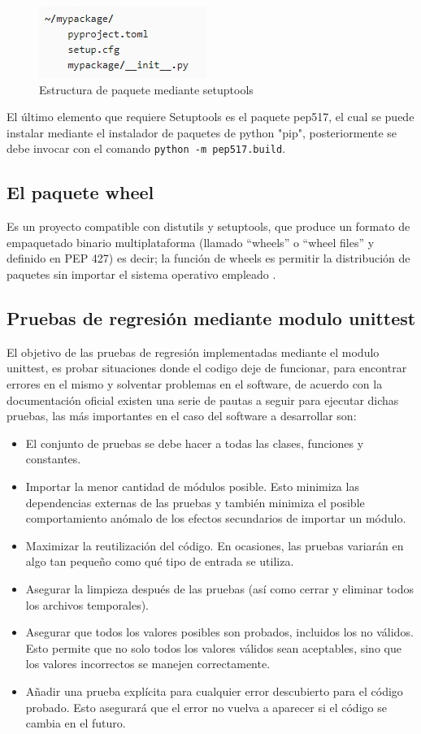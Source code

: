 \begin{figure}[H]
    \centering
    \includegraphics{Recursos/estructuraSetupTools.jpg}
    \caption{Estructura de paquete mediante setuptools}
    \label{estructuraSetupTools}
\end{figure}
El último elemento que requiere Setuptools es el paquete pep517, el cual se puede instalar mediante el instalador de paquetes de python "pip", posteriormente se debe invocar con el comando \texttt{python -m pep517.build}.
\subsection{El paquete wheel}
Es un proyecto compatible con distutils y setuptools, que produce un formato de empaquetado binario multiplataforma (llamado ``wheels'' o ``wheel files'' y definido en PEP 427) es decir; la función de wheels es permitir la distribución de paquetes sin importar el sistema operativo empleado \cite{wheel}.
\subsection{Pruebas de regresión mediante modulo unittest}
El objetivo de las pruebas de regresión implementadas mediante el modulo unittest, es probar situaciones donde el codigo deje de funcionar, para encontrar errores en el mismo y solventar problemas en el software, de acuerdo con la documentación oficial existen una serie de pautas a seguir para ejecutar dichas pruebas, las más importantes en el caso del software a desarrollar son:
\begin{itemize}
    \item El conjunto de pruebas se debe hacer a todas las clases, funciones y constantes.
    \item Importar la menor cantidad de módulos posible. Esto minimiza las dependencias externas de las pruebas y también minimiza el posible comportamiento anómalo de los efectos secundarios de importar un módulo.
    \item Maximizar la reutilización del código. En ocasiones, las pruebas variarán en algo tan pequeño como qué tipo de entrada se utiliza.
    \item Asegurar la limpieza después de las pruebas (así como cerrar y eliminar todos los archivos temporales).
    \item Asegurar que todos los valores posibles son probados, incluidos los no válidos. Esto permite que no solo todos los valores válidos sean aceptables, sino que los valores incorrectos se manejen correctamente.
    \item Añadir una prueba explícita para cualquier error descubierto para el código probado. Esto asegurará que el error no vuelva a aparecer si el código se cambia en el futuro.
\end{itemize}
